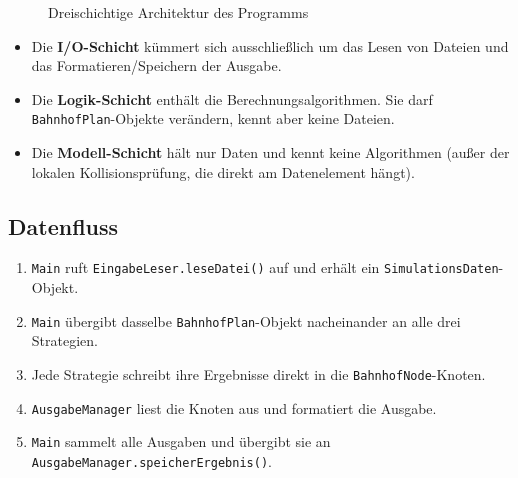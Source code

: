 \documentclass[12pt,a4paper]{article}
\begin{document}
\begin{figure}[H]
\centering
{}
\caption{Dreischichtige Architektur des Programms}
\end{figure}

\begin{itemize}
    \item Die \textbf{I/O-Schicht} kümmert sich ausschließlich um das Lesen von Dateien und das Formatieren/Speichern der Ausgabe.
    \item Die \textbf{Logik-Schicht} enthält die Berechnungsalgorithmen. Sie darf \texttt{BahnhofPlan}-Objekte verändern, kennt aber keine Dateien.
    \item Die \textbf{Modell-Schicht} hält nur Daten und kennt keine Algorithmen (außer der lokalen Kollisionsprüfung, die direkt am Datenelement hängt).
\end{itemize}

\subsection{Datenfluss}

\begin{enumerate}
    \item \texttt{Main} ruft \texttt{EingabeLeser.leseDatei()} auf und erhält ein \texttt{SimulationsDaten}-Objekt.
    \item \texttt{Main} übergibt dasselbe \texttt{BahnhofPlan}-Objekt nacheinander an alle drei Strategien.
    \item Jede Strategie schreibt ihre Ergebnisse direkt in die \texttt{BahnhofNode}-Knoten.
    \item \texttt{AusgabeManager} liest die Knoten aus und formatiert die Ausgabe.
    \item \texttt{Main} sammelt alle Ausgaben und übergibt sie an \texttt{AusgabeManager.speicherErgebnis()}.
\end{enumerate}
\end{document}
